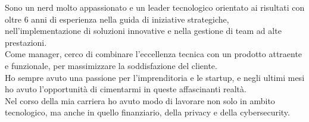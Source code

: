
\begin{cvparagraph}
    Sono un nerd molto appassionato e un leader tecnologico orientato ai risultati con oltre 6 anni di esperienza nella guida di iniziative strategiche, nell'implementazione di soluzioni innovative e nella gestione di team ad alte prestazioni.
    \\Come manager, cerco di combinare l'eccellenza tecnica con un prodotto attraente e funzionale, per massimizzare la soddisfazione del cliente.
    \\Ho sempre avuto una passione per l'imprenditoria e le startup, e negli ultimi mesi ho avuto l'opportunità di cimentarmi in queste affascinanti realtà.
    \\Nel corso della mia carriera ho avuto modo di lavorare non solo in ambito tecnologico, ma anche in quello finanziario, della privacy e della cybersecurity.
\end{cvparagraph}